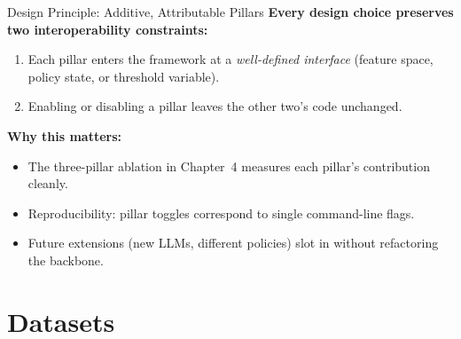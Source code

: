 \documentclass[aspectratio=169,10pt]{beamer}
\begin{document}
\begin{frame}{Design Principle: Additive, Attributable Pillars}
    \textbf{Every design choice preserves two interoperability constraints:}
    \begin{enumerate}
        \item Each pillar enters the framework at a \emph{well-defined interface}
              (feature space, policy state, or threshold variable).
        \item Enabling or disabling a pillar leaves the other two's code unchanged.
    \end{enumerate}
    \vspace{0.5em}
    \textbf{Why this matters:}
    \begin{itemize}
        \item The three-pillar ablation in Chapter~4 measures each pillar's
              contribution cleanly.
        \item Reproducibility: pillar toggles correspond to single command-line flags.
        \item Future extensions (new LLMs, different policies) slot in without
              refactoring the backbone.
    \end{itemize}
\end{frame}

\section{Datasets}
\end{document}
